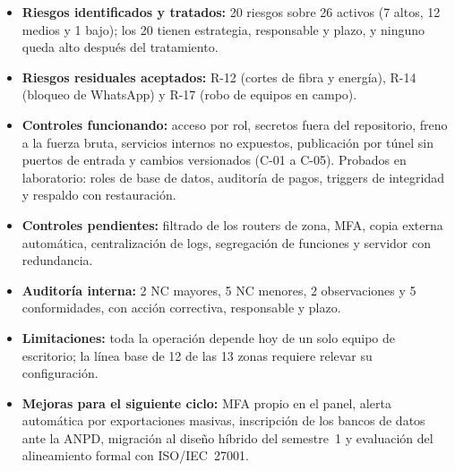 \begin{itemize}
  \item \textbf{Riesgos identificados y tratados:} 20 riesgos sobre 26 activos (7 altos, 12
  medios y 1 bajo); los 20 tienen estrategia, responsable y plazo, y ninguno queda alto
  después del tratamiento.
  \item \textbf{Riesgos residuales aceptados:} R-12 (cortes de fibra y energía), R-14
  (bloqueo de WhatsApp) y R-17 (robo de equipos en campo).
  \item \textbf{Controles funcionando:} acceso por rol, secretos fuera del repositorio,
  freno a la fuerza bruta, servicios internos no expuestos, publicación por túnel sin
  puertos de entrada y cambios versionados (C-01 a C-05). Probados en laboratorio: roles de
  base de datos, auditoría de pagos, triggers de integridad y respaldo con restauración.
  \item \textbf{Controles pendientes:} filtrado de los routers de zona, MFA, copia externa
  automática, centralización de logs, segregación de funciones y servidor con redundancia.
  \item \textbf{Auditoría interna:} 2 NC mayores, 5 NC menores, 2 observaciones y 5
  conformidades, con acción correctiva, responsable y plazo.
  \item \textbf{Limitaciones:} toda la operación depende hoy de un solo equipo de escritorio;
  la línea base de 12 de las 13 zonas requiere relevar su configuración.
  \item \textbf{Mejoras para el siguiente ciclo:} MFA propio en el panel, alerta automática
  por exportaciones masivas, inscripción de los bancos de datos ante la ANPD, migración al
  diseño híbrido del semestre~1 y evaluación del alineamiento formal con ISO/IEC~27001.
\end{itemize}

